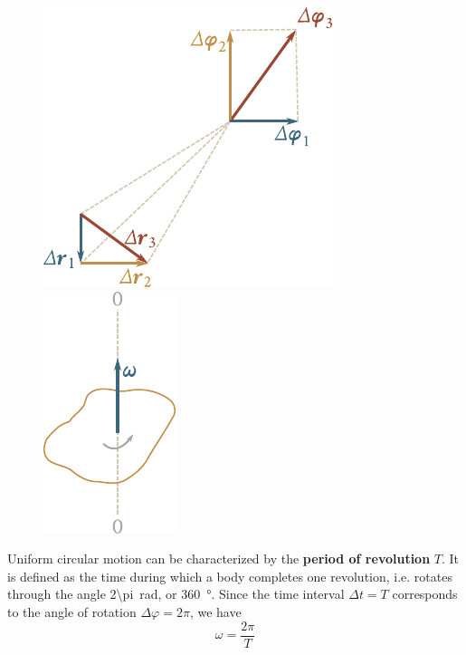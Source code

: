 \begin{figure}[t]
	\begin{minipage}[t]{0.5\linewidth}
		\begin{center}
			\includegraphics[scale=1]{figures/ch_01/fig_1_30.pdf}
			\caption[]{}
			\label{fig:1_30}
		\end{center}
	\end{minipage}
	\hspace{-0.1cm}
	\begin{minipage}[t]{0.5\linewidth}
		\begin{center}
			\includegraphics[scale=0.95]{figures/ch_01/fig_1_31.pdf}
			\caption[]{}
			\label{fig:1_31}
		\end{center}
	\end{minipage}
	\vspace{-0.5cm}
\end{figure}

Uniform circular motion can be characterized by the \textbf{period of revolution} $T$. It is defined as the time  during which a body completes one revolution, i.e. rotates through the angle \SI{2\pi}{\radian}, or \SI{360}{\degree}. Since the time interval $\Delta t=T$ corresponds to the angle of rotation $\Delta\varphi=2\pi$, we have
\begin{equation}\label{eq:1_94}
\omega = \frac{2\pi}{T}
\end{equation}

